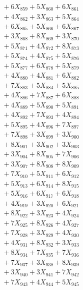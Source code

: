 \documentclass[a4paper,10pt]{article}
\begin{document}
{\begin{align}
&\;  + 6 X_{859} + 5 X_{860} + 6 X_{861} \\[0.3ex]
&\;  + 4 X_{862} + 3 X_{863} + 5 X_{864} \\[0.3ex]
&\;  + 6 X_{865} + 5 X_{866} + 6 X_{867} \\[0.3ex]
&\;  + 3 X_{868} + 8 X_{869} + 3 X_{870} \\[0.3ex]
&\;  + 5 X_{871} + 4 X_{872} + 8 X_{873} \\[0.3ex]
&\;  + 5 X_{874} + 4 X_{875} + 5 X_{876} \\[0.3ex]
&\;  + 5 X_{877} + 6 X_{878} + 5 X_{879} \\[0.5ex]\allowbreak
&\;  + 4 X_{880} + 4 X_{881} + 6 X_{882} \\[0.3ex]
&\;  + 7 X_{883} + 5 X_{884} + 5 X_{885} \\[0.3ex]
&\;  + 4 X_{886} + 7 X_{887} + 6 X_{888} \\[0.3ex]
&\;  + 4 X_{889} + 5 X_{890} + 5 X_{891} \\[0.3ex]
&\;  + 4 X_{892} + 7 X_{893} + 4 X_{894} \\[0.3ex]
&\;  + 5 X_{895} + 4 X_{896} + 7 X_{897} \\[0.3ex]
&\;  + 7 X_{898} + 3 X_{899} + 3 X_{900} \\[0.3ex]
&\;  + 8 X_{901} + 3 X_{902} + 3 X_{903} \\[0.3ex]
&\;  + 3 X_{904} + 8 X_{905} + 7 X_{906} \\[0.3ex]
&\;  + 3 X_{907} + 8 X_{908} + 8 X_{909} \\[0.5ex]\allowbreak
&\;  + 7 X_{910} + 5 X_{911} + 6 X_{912} \\[0.3ex]
&\;  + 5 X_{913} + 6 X_{914} + 8 X_{915} \\[0.3ex]
&\;  + 5 X_{916} + 6 X_{917} + 6 X_{918} \\[0.3ex]
&\;  + 4 X_{919} + 3 X_{920} + 6 X_{921} \\[0.3ex]
&\;  + 8 X_{922} + 3 X_{923} + 4 X_{924} \\[0.3ex]
&\;  + 7 X_{925} + 8 X_{926} + 4 X_{927} \\[0.3ex]
&\;  + 7 X_{928} + 3 X_{929} + 4 X_{930} \\[0.3ex]
&\;  + 4 X_{931} + 8 X_{932} + 3 X_{933} \\[0.3ex]
&\;  + 8 X_{934} + 7 X_{935} + 7 X_{936} \\[0.3ex]
&\;  + 7 X_{937} + 3 X_{938} + 8 X_{939} \\[0.5ex]\allowbreak
&\;  + 3 X_{940} + 3 X_{941} + 7 X_{942} \\[0.3ex]
&\;  + 7 X_{943} + 4 X_{944} + 5 X_{945} \\[0.3ex]

\end{align}}
\end{document}
